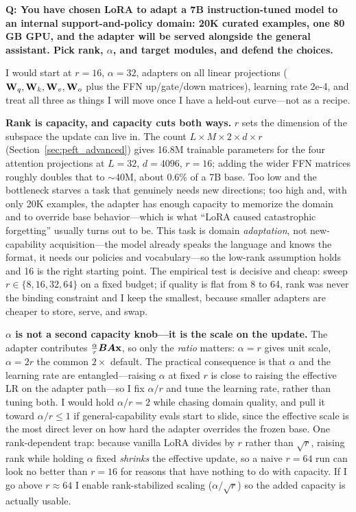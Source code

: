 \begin{interviewq}
\textbf{Q: You have chosen LoRA to adapt a 7B instruction-tuned model to an internal support-and-policy domain: 20K curated examples, one 80\,GB GPU, and the adapter will be served alongside the general assistant. Pick rank, $\alpha$, and target modules, and defend the choices.}

 \quad {} \quad \badgefreq{\freqhigh}

\stronganswer I would start at $r = 16$, $\alpha = 32$, adapters on all linear projections ($\mathbf{W}_q, \mathbf{W}_k, \mathbf{W}_v, \mathbf{W}_o$ plus the FFN up/gate/down matrices), learning rate 2e-4, and treat all three as things I will move once I have a held-out curve---not as a recipe.

\textbf{Rank is capacity, and capacity cuts both ways.} $r$ sets the dimension of the subspace the update can live in. The count $L \times M \times 2 \times d \times r$ (Section~\ref{sec:peft_advanced}) gives 16.8M trainable parameters for the four attention projections at $L = 32$, $d = 4096$, $r = 16$; adding the wider FFN matrices roughly doubles that to $\sim$40M, about 0.6\% of a 7B base. Too low and the bottleneck starves a task that genuinely needs new directions; too high and, with only 20K examples, the adapter has enough capacity to memorize the domain and to override base behavior---which is what ``LoRA caused catastrophic forgetting'' usually turns out to be. This task is domain \emph{adaptation}, not new-capability acquisition---the model already speaks the language and knows the format, it needs our policies and vocabulary---so the low-rank assumption holds and 16 is the right starting point. The empirical test is decisive and cheap: sweep $r \in \{8, 16, 32, 64\}$ on a fixed budget; if quality is flat from 8 to 64, rank was never the binding constraint and I keep the smallest, because smaller adapters are cheaper to store, serve, and swap.

\textbf{$\alpha$ is not a second capacity knob---it is the scale on the update.} The adapter contributes $\frac{\alpha}{r}\bm{B}\bm{A}\mathbf{x}$, so only the \emph{ratio} matters: $\alpha = r$ gives unit scale, $\alpha = 2r$ the common $2\times$ default. The practical consequence is that $\alpha$ and the learning rate are entangled---raising $\alpha$ at fixed $r$ is close to raising the effective LR on the adapter path---so I fix $\alpha/r$ and tune the learning rate, rather than tuning both. I would hold $\alpha/r = 2$ while chasing domain quality, and pull it toward $\alpha/r \le 1$ if general-capability evals start to slide, since the effective scale is the most direct lever on how hard the adapter overrides the frozen base. One rank-dependent trap: because vanilla LoRA divides by $r$ rather than $\sqrt{r}$, raising rank while holding $\alpha$ fixed \emph{shrinks} the effective update, so a naive $r = 64$ run can look no better than $r = 16$ for reasons that have nothing to do with capacity. If I go above $r \approx 64$ I enable rank-stabilized scaling ($\alpha/\sqrt{r}$) so the added capacity is actually usable.


\end{interviewq}
